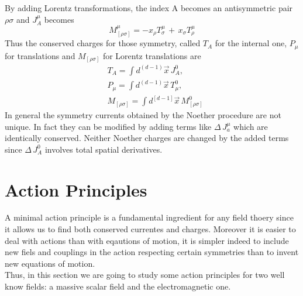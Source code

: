 \documentclass[a4paper,10pt]{article}
\begin{document}
By adding Lorentz transformations, the index A becomes an antisymmetric pair $\rho\sigma$
and $J^\mu_A$ becomes
\begin{equation}
 M^\mu_{[\rho \sigma]}=-x_\rho T^\mu_\sigma \, + \, x_\sigma T^\mu_\rho
\end{equation}
Thus the conserved charges for those symmetry, called $T_A$ for the internal one, $P_\mu$ for translations and $M_{[\rho \sigma]}$ for Lorentz translations are
\begin{equation}
 \begin{align}
  &T_A=\int{d^{(d-1)}\overrightarrow{x}\,J^0_A},\\
  &P_\mu=\int{d^{(d-1)}\overrightarrow{x}\,T^0_\mu},\\
  &M_{[\rho \sigma]}=\int{d^{[d-1]}\overrightarrow{x}\,M^0_{[\rho \sigma]}}
 \end{align}
\end{equation}
In general the symmetry currents obtained by the Noether procedure are not unique.
In fact they can be modified by adding terms like $\Delta\,J^\mu_a$ which are identically conserved.
Neither Noether charges are changed by the added terms since $\Delta\,J^0_A$ involves total spatial derivatives.


\section{Action Principles}
A minimal action principle is a fundamental ingredient for any field thoery since it allows us to find both conserved currentes and charges. Moreover it is easier to deal with actions than with eqautions of  motion, it is simpler indeed to include new fiels and couplings in the action respecting certain symmetries than to invent new equations of motion.\\
Thus, in this section we are going to study some action principles for two well know fields: a massive scalar field and the electromagnetic one.\\
\end{document}
